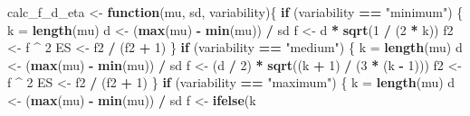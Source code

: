 \documentclass[]{book}
\newenvironment{Shaded}{\begin{snugshade}}{\end{snugshade}}
\newcommand{\ControlFlowTok}[1]{\textcolor[rgb]{0.13,0.29,0.53}{\textbf{#1}}}
\newcommand{\DecValTok}[1]{\textcolor[rgb]{0.00,0.00,0.81}{#1}}
\newcommand{\FloatTok}[1]{\textcolor[rgb]{0.00,0.00,0.81}{#1}}
\newcommand{\KeywordTok}[1]{\textcolor[rgb]{0.13,0.29,0.53}{\textbf{#1}}}
\newcommand{\NormalTok}[1]{#1}
\newcommand{\OperatorTok}[1]{\textcolor[rgb]{0.81,0.36,0.00}{\textbf{#1}}}
\newcommand{\StringTok}[1]{\textcolor[rgb]{0.31,0.60,0.02}{#1}}
\begin{document}
\begin{Shaded}
\begin{Highlighting}[]
\NormalTok{calc_f_d_eta <-}\StringTok{ }\ControlFlowTok{function}\NormalTok{(mu, sd, variability)\{}
  \ControlFlowTok{if}\NormalTok{ (variability }\OperatorTok{==}\StringTok{ "minimum"}\NormalTok{) \{}
\NormalTok{    k =}\StringTok{ }\KeywordTok{length}\NormalTok{(mu)}
\NormalTok{    d <-}\StringTok{ }\NormalTok{(}\KeywordTok{max}\NormalTok{(mu) }\OperatorTok{-}\StringTok{ }\KeywordTok{min}\NormalTok{(mu)) }\OperatorTok{/}\StringTok{ }\NormalTok{sd}
\NormalTok{    f <-}\StringTok{ }\NormalTok{d }\OperatorTok{*}\StringTok{ }\KeywordTok{sqrt}\NormalTok{(}\DecValTok{1} \OperatorTok{/}\StringTok{ }\NormalTok{(}\DecValTok{2} \OperatorTok{*}\StringTok{ }\NormalTok{k))}
\NormalTok{    f2 <-}\StringTok{ }\NormalTok{f }\OperatorTok{^}\StringTok{ }\DecValTok{2}
\NormalTok{    ES <-}\StringTok{ }\NormalTok{f2 }\OperatorTok{/}\StringTok{ }\NormalTok{(f2 }\OperatorTok{+}\StringTok{ }\DecValTok{1}\NormalTok{)}
\NormalTok{  \}}
  \ControlFlowTok{if}\NormalTok{ (variability }\OperatorTok{==}\StringTok{ "medium"}\NormalTok{) \{}
\NormalTok{    k =}\StringTok{ }\KeywordTok{length}\NormalTok{(mu)}
\NormalTok{    d <-}\StringTok{ }\NormalTok{(}\KeywordTok{max}\NormalTok{(mu) }\OperatorTok{-}\StringTok{ }\KeywordTok{min}\NormalTok{(mu)) }\OperatorTok{/}\StringTok{ }\NormalTok{sd}
\NormalTok{    f <-}\StringTok{ }\NormalTok{(d }\OperatorTok{/}\StringTok{ }\DecValTok{2}\NormalTok{) }\OperatorTok{*}\StringTok{ }\KeywordTok{sqrt}\NormalTok{((k }\OperatorTok{+}\StringTok{ }\DecValTok{1}\NormalTok{) }\OperatorTok{/}\StringTok{ }\NormalTok{(}\DecValTok{3} \OperatorTok{*}\StringTok{ }\NormalTok{(k }\OperatorTok{-}\StringTok{ }\DecValTok{1}\NormalTok{)))}
\NormalTok{    f2 <-}\StringTok{ }\NormalTok{f }\OperatorTok{^}\StringTok{ }\DecValTok{2}
\NormalTok{    ES <-}\StringTok{ }\NormalTok{f2 }\OperatorTok{/}\StringTok{ }\NormalTok{(f2 }\OperatorTok{+}\StringTok{ }\DecValTok{1}\NormalTok{)}
\NormalTok{  \}}
  \ControlFlowTok{if}\NormalTok{ (variability }\OperatorTok{==}\StringTok{ "maximum"}\NormalTok{) \{}
\NormalTok{    k =}\StringTok{ }\KeywordTok{length}\NormalTok{(mu)}
\NormalTok{    d <-}\StringTok{ }\NormalTok{(}\KeywordTok{max}\NormalTok{(mu) }\OperatorTok{-}\StringTok{ }\KeywordTok{min}\NormalTok{(mu)) }\OperatorTok{/}\StringTok{ }\NormalTok{sd}
\NormalTok{    f <-}\StringTok{ }\KeywordTok{ifelse}\NormalTok{(k }\OperatorTok{%
}
\end{Highlighting}
\end{Shaded}
\end{document}
